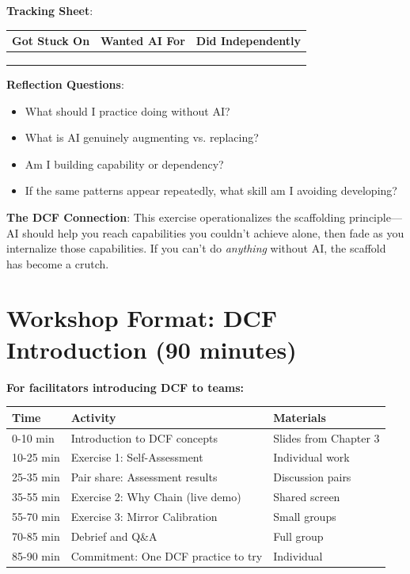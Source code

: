\textbf{Tracking Sheet}:
\begin{table}[H]
\centering
\begin{tabular}{p{4cm}p{4cm}p{4cm}}
\toprule
\textbf{Got Stuck On} & \textbf{Wanted AI For} & \textbf{Did Independently} \\
\midrule
& & \\
& & \\
& & \\
\bottomrule
\end{tabular}
\end{table}

\textbf{Reflection Questions}:
\begin{itemize}
    \item What should I practice doing without AI?
    \item What is AI genuinely augmenting vs. replacing?
    \item Am I building capability or dependency?
    \item If the same patterns appear repeatedly, what skill am I avoiding developing?
\end{itemize}

\textbf{The DCF Connection}: This exercise operationalizes the scaffolding principle---AI should help you reach capabilities you couldn't achieve alone, then fade as you internalize those capabilities. If you can't do \emph{anything} without AI, the scaffold has become a crutch.

\section{Workshop Format: DCF Introduction (90 minutes)}

\textbf{For facilitators introducing DCF to teams:}

\begin{table}[H]
\centering
\begin{tabular}{lll}
\toprule
\textbf{Time} & \textbf{Activity} & \textbf{Materials} \\
\midrule
0-10 min & Introduction to DCF concepts & Slides from Chapter 3 \\
10-25 min & Exercise 1: Self-Assessment & Individual work \\
25-35 min & Pair share: Assessment results & Discussion pairs \\
35-55 min & Exercise 2: Why Chain (live demo) & Shared screen \\
55-70 min & Exercise 3: Mirror Calibration & Small groups \\
70-85 min & Debrief and Q\&A & Full group \\
85-90 min & Commitment: One DCF practice to try & Individual \\
\bottomrule
\end{tabular}
\end{table}

